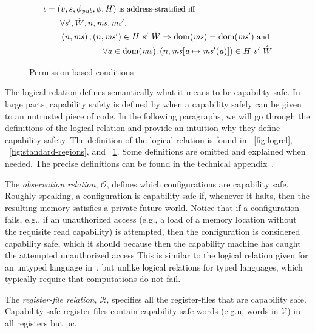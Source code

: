 \documentclass[compsoc,conference,letterpaper,fleqn]{IEEEtran}
\newcommand{\update}[2]{[#1 \mapsto #2]}
\DeclareMathOperator{\dom}{dom}
\newcommand{\var}[1]{\mathit{#1}}
\newcommand{\hs}{\var{ms}}
\newcommand{\ms}{\hs}
\newcommand{\pcreg}{\mathrm{pc}}
\newcommand{\addr}{\var{a}}
\newcommand{\pub}{\var{pub}}
\newcommand{\asmType}{\plaindom{AsmType}}
\newcommand{\plaindom}[1]{\mathrm{#1}}
\newcommand{\intr}[2]{\mathcal{#1}}
\newcommand{\valueintr}[1]{\intr{V}{#1}}
\newcommand{\regintr}[1]{\intr{R}{#1}}
\newcommand{\stdvr}{\valueintr{\asmType}}
\newcommand{\stdrr}{\regintr{\asmType}}
\newcommand{\observations}{\mathcal{O}}
\newcommand{\npair}[2][n]{\left(#1,#2 \right)}
\begin{document}
{\begin{figure}[htbp]
\begin{align*}
  \end{align*}
  \begin{align*}
    &\iota = (v,s,\phi_\pub,\phi,H) \text{\footnotesize{ is address-stratified iff}}\\
    &\qquad\begin{multlined}
      \forall s', \hat{W}, n, \ms, \ms' \ldotp \\
      \npair{\ms},\npair{\ms'} \in H~ s'~ \hat{W} \Rightarrow 
      \dom(\ms) = \dom(\ms') \text{\footnotesize{ and }} \\
      \forall \addr \in
      \dom(\ms)\ldotp \npair{\ms\update{\addr}{\ms'(\addr)}} \in H~ s'~ \hat{W}
    \end{multlined}
  \end{align*}

\caption{Permission-based conditions}
\label{fig:perm-conds}
\end{figure}
}
The logical relation defines semantically what it means to be
capability safe. In large parts, capability safety is defined by
when a capability safely can be given to an untrusted piece of
code. In the following paragraphs, we will go through the definitions
of the logical relation and provide an intuition why they define
capability safety.
The definition of the logical relation is found in
\figurename~\ref{fig:logrel}, \figurename~\ref{fig:standard-regions},
and \figurename~\ref{fig:perm-conds}. Some definitions are omitted and
explained when needed. The precise definitions can be found in the
technical appendix~\cite{XXX}.

The \emph{observation relation}, $\observations$, defines which
configurations are capability safe. Roughly speaking,
a configuration is capability safe if, whenever it halts, then
the resulting memory satisfies a private future world. 
Notice that if a configuration fails, e.g., if an unauthorized access 
(e.g., a load of a memory location without the requisite read capability)
is attempted, then the configuration is considered capability safe, which it should
because then the capability machine has caught the attempted unauthorized access
This is similar to the logical relation given for an untyped language
in~\cite{Devriese:2016ObjCap}, but unlike logical relations for typed languages, which
typically require that computations do not fail. 

The \emph{register-file relation}, $\stdrr$, specifies all the
register-files that are capability safe. Capability safe
register-files contain capability safe words (e.g.n, words in
$\stdvr$) in all registers but $\pcreg$.
\end{document}
